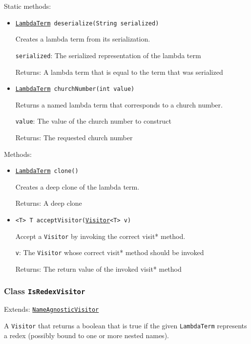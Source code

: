 Static methods:
\begin{itemize}
\item \texttt{\hyperref[type:edu.kit.wavelength.client.model.term.LambdaTerm]{LambdaTerm} deserialize(String serialized)}

Creates a lambda term from its serialization.

\texttt{serialized}: The serialized representation of the lambda term

Returns: A lambda term that is equal to the term that was serialized

\item \texttt{\hyperref[type:edu.kit.wavelength.client.model.term.LambdaTerm]{LambdaTerm} churchNumber(int value)}

Returns a named lambda term that corresponds to a church number.

\texttt{value}: The value of the church number to construct

Returns: The requested church number

\end{itemize}

Methods:
\begin{itemize}
\item \texttt{\hyperref[type:edu.kit.wavelength.client.model.term.LambdaTerm]{LambdaTerm} clone()}

Creates a deep clone of the lambda term.

Returns: A deep clone

\item \texttt{<T> T acceptVisitor(\hyperref[type:edu.kit.wavelength.client.model.term.Visitor]{Visitor}<T> v)}

Accept a \texttt{Visitor} by invoking the correct visit* method.

\texttt{v}: The \texttt{Visitor} whose correct visit* method should be invoked

Returns: The return value of the invoked visit* method

\end{itemize}

\subsubsection{Class \texttt{IsRedexVisitor}}
\label{type:edu.kit.wavelength.client.model.term.IsRedexVisitor}
Extends: \texttt{\hyperref[type:edu.kit.wavelength.client.model.term.NameAgnosticVisitor]{NameAgnosticVisitor}}

A \texttt{Visitor} that returns a boolean that is true if the given
 \texttt{LambdaTerm} represents a redex (possibly bound to one or more nested
 names).

